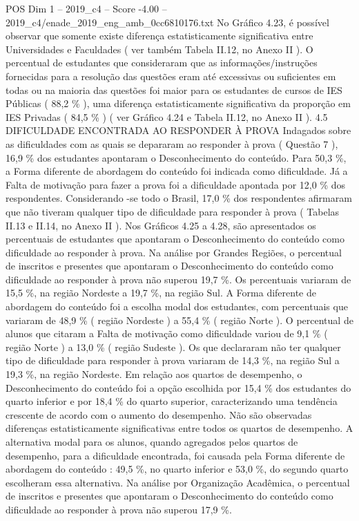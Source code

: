 \begin{textsample}{POS Dim 1 – 2019\_c4 – Score -4.00 – 2019\_c4/enade\_2019\_eng\_amb\_0cc6810176.txt}
No Gráfico 4.23, é possível observar que somente existe diferença estatisticamente significativa entre Universidades e Faculdades ( ver também Tabela II.12, no Anexo II ).
O percentual de estudantes que consideraram que as informações/instruções fornecidas para a resolução das questões eram até excessivas ou suficientes em todas ou na maioria das questões foi maior para os estudantes de cursos de IES Públicas ( 88,2 \% ), uma diferença estatisticamente significativa da proporção em IES Privadas ( 84,5 \% ) ( ver Gráfico 4.24 e Tabela II.12, no Anexo II ). 4.5 DIFICULDADE ENCONTRADA AO RESPONDER À PROVA Indagados sobre as dificuldades com as quais se depararam ao responder à prova ( Questão 7 ), 16,9 \% dos estudantes apontaram o Desconhecimento do conteúdo.
Para 50,3 \%, a Forma diferente de abordagem do conteúdo foi indicada como dificuldade.
Já a Falta de motivação para fazer a prova foi a dificuldade apontada por 12,0 \% dos respondentes.
Considerando -se todo o Brasil, 17,0 \% dos respondentes afirmaram que não tiveram qualquer tipo de dificuldade para responder à prova ( Tabelas II.13 e II.14, no Anexo II ).
Nos Gráficos 4.25 a 4.28, são apresentados os percentuais de estudantes que apontaram o Desconhecimento do conteúdo como dificuldade ao responder à prova.
Na análise por Grandes Regiões, o percentual de inscritos e presentes que apontaram o Desconhecimento do conteúdo como dificuldade ao responder à prova não superou 19,7 \%.
Os percentuais variaram de 15,5 \%, na região Nordeste a 19,7 \%, na região Sul.
A Forma diferente de abordagem do conteúdo foi a escolha modal dos estudantes, com percentuais que variaram de 48,9 \% ( região Nordeste ) a 55,4 \% ( região Norte ).
O percentual de alunos que citaram a Falta de motivação como dificuldade variou de 9,1 \% ( região Norte ) a 13,0 \% ( região Sudeste ).
Os que declararam não ter qualquer tipo de dificuldade para responder à prova variaram de 14,3 \%, na região Sul a 19,3 \%, na região Nordeste.
Em relação aos quartos de desempenho, o Desconhecimento do conteúdo foi a opção escolhida por 15,4 \% dos estudantes do quarto inferior e por 18,4 \% do quarto superior, caracterizando uma tendência crescente de acordo com o aumento do desempenho.
Não são observadas diferenças estatisticamente significativas entre todos os quartos de desempenho.
A alternativa modal para os alunos, quando agregados pelos quartos de desempenho, para a dificuldade encontrada, foi causada pela Forma diferente de abordagem do conteúdo : 49,5 \%, no quarto inferior e 53,0 \%, do segundo quarto escolheram essa alternativa.
Na análise por Organização Acadêmica, o percentual de inscritos e presentes que apontaram o Desconhecimento do conteúdo como dificuldade ao responder à prova não superou 17,9 \%.

\end{textsample}
